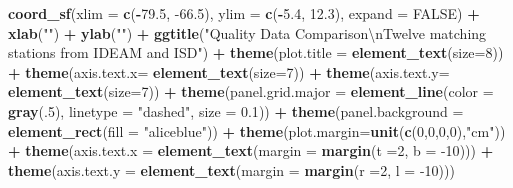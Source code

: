 \documentclass[12pt,oneside]{reedthesis}
\newenvironment{Shaded}{\begin{snugshade}}{\end{snugshade}}
\newcommand{\CharTok}[1]{\textcolor[rgb]{0.31,0.60,0.02}{#1}}
\newcommand{\DataTypeTok}[1]{\textcolor[rgb]{0.13,0.29,0.53}{#1}}
\newcommand{\DecValTok}[1]{\textcolor[rgb]{0.00,0.00,0.81}{#1}}
\newcommand{\FloatTok}[1]{\textcolor[rgb]{0.00,0.00,0.81}{#1}}
\newcommand{\KeywordTok}[1]{\textcolor[rgb]{0.13,0.29,0.53}{\textbf{#1}}}
\newcommand{\NormalTok}[1]{#1}
\newcommand{\OperatorTok}[1]{\textcolor[rgb]{0.81,0.36,0.00}{\textbf{#1}}}
\newcommand{\OtherTok}[1]{\textcolor[rgb]{0.56,0.35,0.01}{#1}}
\newcommand{\StringTok}[1]{\textcolor[rgb]{0.31,0.60,0.02}{#1}}
\begin{document}
\begin{Shaded}
\begin{Highlighting}[]
{{{{\StringTok{  }\KeywordTok{coord_sf}\NormalTok{(}\DataTypeTok{xlim =} \KeywordTok{c}\NormalTok{(}\OperatorTok{-}\FloatTok{79.5}\NormalTok{, }\FloatTok{-66.5}\NormalTok{), }\DataTypeTok{ylim =} \KeywordTok{c}\NormalTok{(}\OperatorTok{-}\FloatTok{5.4}\NormalTok{, }\FloatTok{12.3}\NormalTok{), }\DataTypeTok{expand =} \OtherTok{FALSE}\NormalTok{) }\OperatorTok{+}
\StringTok{  }\KeywordTok{xlab}\NormalTok{(}\StringTok{""}\NormalTok{) }\OperatorTok{+}\StringTok{ }
\StringTok{  }\KeywordTok{ylab}\NormalTok{(}\StringTok{""}\NormalTok{) }\OperatorTok{+}\StringTok{ }
\StringTok{  }\KeywordTok{ggtitle}\NormalTok{(}\StringTok{"Quality Data Comparison}\CharTok{\textbackslash{}n}\StringTok{Twelve matching stations from IDEAM and ISD"}\NormalTok{) }\OperatorTok{+}\StringTok{ }
\StringTok{  }\KeywordTok{theme}\NormalTok{(}\DataTypeTok{plot.title =} \KeywordTok{element_text}\NormalTok{(}\DataTypeTok{size=}\DecValTok{8}\NormalTok{)) }\OperatorTok{+}
\StringTok{  }\KeywordTok{theme}\NormalTok{(}\DataTypeTok{axis.text.x=} \KeywordTok{element_text}\NormalTok{(}\DataTypeTok{size=}\DecValTok{7}\NormalTok{)) }\OperatorTok{+}\StringTok{ }
\StringTok{  }\KeywordTok{theme}\NormalTok{(}\DataTypeTok{axis.text.y=} \KeywordTok{element_text}\NormalTok{(}\DataTypeTok{size=}\DecValTok{7}\NormalTok{)) }\OperatorTok{+}
\StringTok{  }\KeywordTok{theme}\NormalTok{(}\DataTypeTok{panel.grid.major =} \KeywordTok{element_line}\NormalTok{(}\DataTypeTok{color =} \KeywordTok{gray}\NormalTok{(.}\DecValTok{5}\NormalTok{), }\DataTypeTok{linetype =} \StringTok{"dashed"}\NormalTok{, }\DataTypeTok{size =} \FloatTok{0.1}\NormalTok{)) }\OperatorTok{+}
\StringTok{  }\KeywordTok{theme}\NormalTok{(}\DataTypeTok{panel.background =} \KeywordTok{element_rect}\NormalTok{(}\DataTypeTok{fill =} \StringTok{"aliceblue"}\NormalTok{)) }\OperatorTok{+}
\StringTok{  }\KeywordTok{theme}\NormalTok{(}\DataTypeTok{plot.margin=}\KeywordTok{unit}\NormalTok{(}\KeywordTok{c}\NormalTok{(}\DecValTok{0}\NormalTok{,}\DecValTok{0}\NormalTok{,}\DecValTok{0}\NormalTok{,}\DecValTok{0}\NormalTok{),}\StringTok{"cm"}\NormalTok{)) }\OperatorTok{+}
\StringTok{  }\KeywordTok{theme}\NormalTok{(}\DataTypeTok{axis.text.x =} \KeywordTok{element_text}\NormalTok{(}\DataTypeTok{margin =}  \KeywordTok{margin}\NormalTok{(}\DataTypeTok{t =}\DecValTok{2}\NormalTok{, }\DataTypeTok{b =} \DecValTok{-10}\NormalTok{))) }\OperatorTok{+}\StringTok{ }
\StringTok{  }\KeywordTok{theme}\NormalTok{(}\DataTypeTok{axis.text.y =} \KeywordTok{element_text}\NormalTok{(}\DataTypeTok{margin =}  \KeywordTok{margin}\NormalTok{(}\DataTypeTok{r =}\DecValTok{2}\NormalTok{, }\DataTypeTok{l =} \DecValTok{-10}\NormalTok{)))}
  
}}}}
\end{Highlighting}
\end{Shaded}
\end{document}
